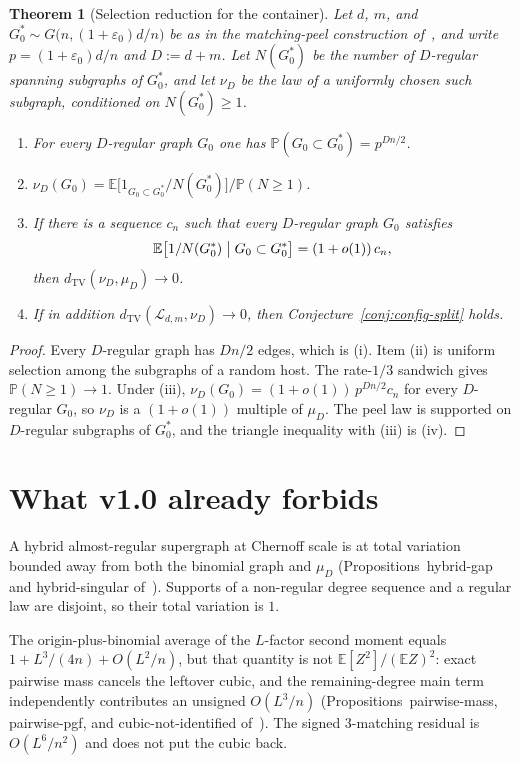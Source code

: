 \documentclass[11pt]{article}
\newtheorem{theorem}{Theorem}
\newcommand{\EE}{\mathbb{E}}
\newcommand{\PP}{\mathbb{P}}
\newcommand{\dTV}{d_{\mathrm{TV}}}
\begin{document}
\begin{theorem}[Selection reduction for the container]
\label{thm:selection-reduces}
Let \(d\), \(m\), and \(G^*_0\sim G\bigl(n,(1+\varepsilon_0)d/n\bigr)\) be as in the
matching-peel construction of~\cite{PlusOneV1}, and write
\(p=(1+\varepsilon_0)d/n\) and \(D:=d+m\).
Let \(N(G^*_0)\) be the number of \(D\)-regular spanning subgraphs of \(G^*_0\),
and let \(\nu_D\) be the law of a uniformly chosen such subgraph, conditioned
on \(N(G^*_0)\ge 1\).
\begin{enumerate}
\item For every \(D\)-regular graph \(G_0\) one has \(\PP(G_0\subset G^*_0)=p^{Dn/2}\).
\item \(\nu_D(G_0)=\EE\bigl[1_{G_0\subset G^*_0}/N(G^*_0)\bigr]/\PP(N\ge 1)\).
\item If there is a sequence \(c_n\) such that every \(D\)-regular graph \(G_0\) satisfies
\[
\EE\bigl[1/N(G^*_0)\bigm|G_0\subset G^*_0\bigr]
=
(1+o(1))\,c_n,
\]
then \(\dTV(\nu_D,\mu_D)\to 0\).
\item If in addition \(\dTV(\mathcal{L}_{d,m},\nu_D)\to 0\), then
Conjecture~\ref{conj:config-split} holds.
\end{enumerate}
\end{theorem}

\begin{proof}
Every \(D\)-regular graph has \(Dn/2\) edges, which is (i).
Item (ii) is uniform selection among the subgraphs of a random host.
The rate-\(1/3\) sandwich gives \(\PP(N\ge 1)\to 1\).
Under (iii), \(\nu_D(G_0)=(1+o(1))\,p^{Dn/2}c_n\) for every \(D\)-regular \(G_0\),
so \(\nu_D\) is a \((1+o(1))\) multiple of \(\mu_D\).
The peel law is supported on \(D\)-regular subgraphs of \(G^*_0\), and the
triangle inequality with (iii) is (iv).
\end{proof}

\section{What v1.0 already forbids}

A hybrid almost-regular supergraph at Chernoff scale is at total variation
bounded away from both the binomial graph and \(\mu_D\)
(Propositions~hybrid-gap and hybrid-singular of~\cite{PlusOneV1}).
Supports of a non-regular degree sequence and a regular law are disjoint, so
their total variation is \(1\).

The origin-plus-binomial average of the \(L\)-factor second moment equals
\(1+L^3/(4n)+O(L^2/n)\), but that quantity is not \(\EE[Z^2]/(\EE Z)^2\):
exact pairwise mass cancels the leftover cubic, and the remaining-degree main
term independently contributes an unsigned \(O(L^3/n)\)
(Propositions~pairwise-mass, pairwise-pgf, and cubic-not-identified
of~\cite{PlusOneV1}).
The signed \(3\)-matching residual is \(O(L^6/n^2)\) and does not put the cubic
back.
\end{document}
